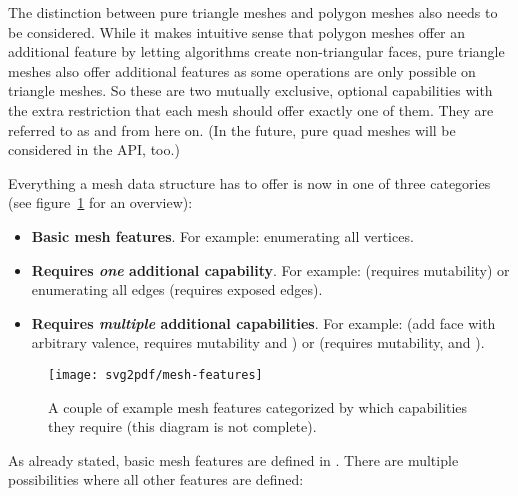 The distinction between pure triangle meshes and polygon meshes also needs to be considered.
While it makes intuitive sense that polygon meshes offer an additional feature by letting algorithms create non-triangular faces, pure triangle meshes also offer additional features as some operations are only possible on triangle meshes.
So these are two mutually exclusive, optional capabilities with the extra restriction that each mesh should offer exactly one of them.
They are referred to as  and  from here on.
(In the future, pure quad meshes will be considered in the API, too.)

Everything a mesh data structure has to offer is now in one of three categories (see figure~\ref{fig:mesh-features} for an overview):

\begin{itemize}
  \item \textbf{Basic mesh features}. For example: enumerating all vertices.
  \item \textbf{Requires \emph{one} additional capability}. For example:  (requires mutability) or enumerating all edges (requires exposed edges).
  \item \textbf{Requires \emph{multiple} additional capabilities}. For example:  (add face with arbitrary valence, requires mutability and ) or  (requires mutability,  and ). %
\end{itemize}

\begin{figure}[t]
  \centering
  \texttt{[image: svg2pdf/mesh-features]}
  \caption{
    A couple of example mesh features categorized by which capabilities they require (this diagram is not complete).
  }
  \label{fig:mesh-features}
\end{figure}

As already stated, basic mesh features are defined in .
There are multiple possibilities where all other features are defined:

